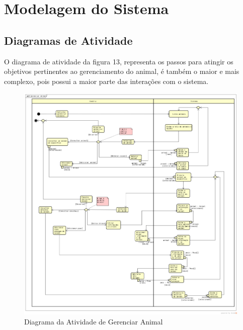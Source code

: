 \documentclass[12pt]{article}
\begin{document}
\newpage
\section{Modelagem do Sistema}

\subsection{Diagramas de Atividade}

O diagrama de atividade da figura 13, representa os passos para atingir os objetivos pertinentes ao gerenciamento do animal, é também o maior e mais complexo, pois possui a maior parte das interações com o sistema.

\begin{figure}[!h]
	\begin{center}
		\caption{Diagrama da Atividade de Gerenciar Animal}
		\includegraphics[width=6in]{img/atividadeanimal.png}

	\end{center}
\end{figure}

\newpage
\end{document}
